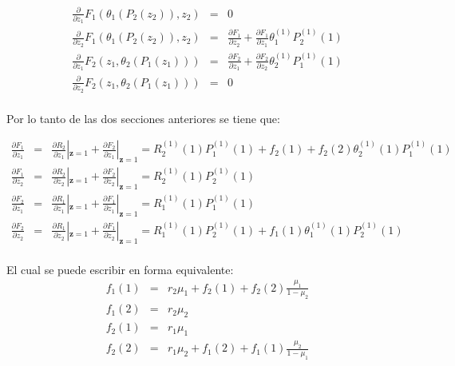 \begin{eqnarray*}
\frac{\partial}{\partial
z_{1}}F_{1}\left(\theta_{1}\left(P_{2}\left(z_{2}\right)\right),z_{2}\right)&=&0\\
\frac{\partial}{\partial
z_{2}}F_{1}\left(\theta_{1}\left(P_{2}\left(z_{2}\right)\right),z_{2}\right)&=&\frac{\partial
F_{1}}{\partial z_{2}}+\frac{\partial F_{1}}{\partial
z_{1}}\theta_{1}^{(1)}P_{2}^{(1)}\left(1\right)\\
\frac{\partial}{\partial
z_{1}}F_{2}\left(z_{1},\theta_{2}\left(P_{1}\left(z_{1}\right)\right)\right)&=&\frac{\partial
F_{2}}{\partial z_{1}}+\frac{\partial F_{2}}{\partial
z_{2}}\theta_{2}^{(1)}P_{1}^{(1)}\left(1\right)\\
\frac{\partial}{\partial
z_{2}}F_{2}\left(z_{1},\theta_{2}\left(P_{1}\left(z_{1}\right)\right)\right)&=&0\\
\end{eqnarray*}


Por lo tanto de las dos secciones anteriores se tiene que:


\begin{eqnarray*}
\frac{\partial F_{1}}{\partial z_{1}}&=&\frac{\partial
R_{2}}{\partial z_{1}}|_{\mathbf{z}=1}+\frac{\partial F_{2}}{\partial z_{1}}|_{\mathbf{z}=1}=R_{2}^{(1)}\left(1\right)P_{1}^{(1)}\left(1\right)+f_{2}\left(1\right)+f_{2}\left(2\right)\theta_{2}^{(1)}\left(1\right)P_{1}^{(1)}\left(1\right)\\
\frac{\partial F_{1}}{\partial z_{2}}&=&\frac{\partial
R_{2}}{\partial z_{2}}|_{\mathbf{z}=1}+\frac{\partial F_{2}}{\partial z_{2}}|_{\mathbf{z}=1}=R_{2}^{(1)}\left(1\right)P_{2}^{(1)}\left(1\right)\\
\frac{\partial F_{2}}{\partial z_{1}}&=&\frac{\partial
R_{1}}{\partial z_{1}}|_{\mathbf{z}=1}+\frac{\partial F_{1}}{\partial z_{1}}|_{\mathbf{z}=1}=R_{1}^{(1)}\left(1\right)P_{1}^{(1)}\left(1\right)\\
\frac{\partial F_{2}}{\partial z_{2}}&=&\frac{\partial
R_{1}}{\partial z_{2}}|_{\mathbf{z}=1}+\frac{\partial F_{1}}{\partial z_{2}}|_{\mathbf{z}=1}
=R_{1}^{(1)}\left(1\right)P_{2}^{(1)}\left(1\right)+f_{1}\left(1\right)\theta_{1}^{(1)}\left(1\right)P_{2}^{(1)}\left(1\right)\\
\end{eqnarray*}


El cual se puede escribir en forma equivalente:
\begin{eqnarray*}
f_{1}\left(1\right)&=&r_{2}\mu_{1}+f_{2}\left(1\right)+f_{2}\left(2\right)\frac{\mu_{1}}{1-\mu_{2}}\\
f_{1}\left(2\right)&=&r_{2}\mu_{2}\\
f_{2}\left(1\right)&=&r_{1}\mu_{1}\\
f_{2}\left(2\right)&=&r_{1}\mu_{2}+f_{1}\left(2\right)+f_{1}\left(1\right)\frac{\mu_{2}}{1-\mu_{1}}\\
\end{eqnarray*}

